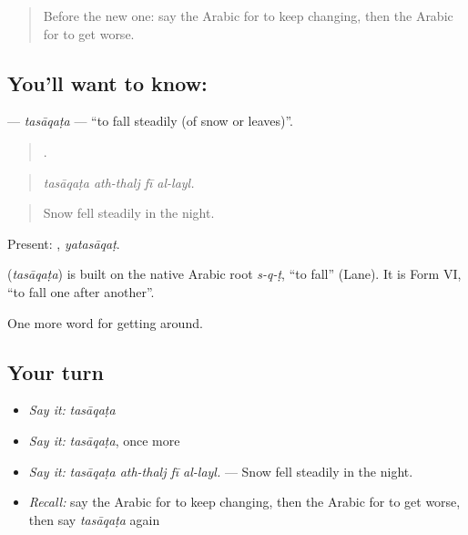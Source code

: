 \label{lesson:AR-C486-tasaqata}



\begin{quote}
Before the new one: say the Arabic for to keep changing, then the Arabic for to get worse.
\end{quote}

\subsection*{You'll want to know: }
\textbf{} — \emph{tasāqaṭa} — \textquotedblleft{}to fall steadily (of snow or leaves)\textquotedblright{}.

\begin{quote}
   .
\end{quote}

\begin{quote}
\emph{tasāqaṭa ath-thalj fī al-layl.}
\end{quote}

\begin{quote}
Snow fell steadily in the night.
\end{quote}

Present: , \emph{yatasāqaṭ}.

\begin{cousinweb}
\textbf{} (\emph{tasāqaṭa}) is built on the native Arabic root \emph{s-q-ṭ}, \textquotedblleft{}to fall\textquotedblright{} (Lane). It is Form VI, \textquotedblleft{}to fall one after another\textquotedblright{}.
\end{cousinweb}

\begin{grammarlens}[title={What you've built}]
One more word for getting around.
\end{grammarlens}

\subsection*{Your turn}
\begin{itemize}
\raggedright
  \item \emph{Say it:} \emph{tasāqaṭa}
  \item \emph{Say it:} \emph{tasāqaṭa}, once more
  \item \emph{Say it:} \emph{tasāqaṭa ath-thalj fī al-layl.} — Snow fell steadily in the night.
  \item \emph{Recall:} say the Arabic for to keep changing, then the Arabic for to get worse, then say \emph{tasāqaṭa} again
\end{itemize}


